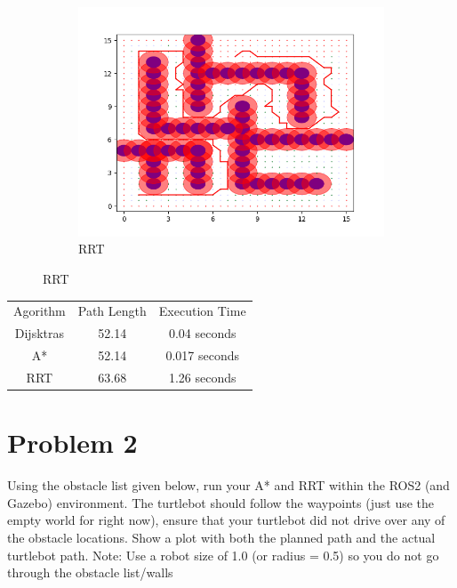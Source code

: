 \documentclass{article}
\begin{document}
\begin{figure}[H]
\begin {subfigure} [b] {0.5\textwidth}
        \includegraphics[width=\textwidth]{question1_rrt_path.png}
        \caption*{RRT}
    \end {subfigure}
\end{figure}

\bigskip
\begin{center}
    \begin{tabular}{ c c c }
        Agorithm & Path Length & Execution Time \\ 
        Dijsktras & 52.14 & 0.04 seconds \\
        A* & 52.14 & 0.017 seconds \\  
        RRT & 63.68 & 1.26 seconds \\

    \end{tabular}
\end{center}

\section*{Problem 2}
Using the obstacle list given below, run your A* and RRT within the ROS2 (and Gazebo)
environment. The turtlebot should follow the waypoints (just use the empty world for right now),
ensure that your turtlebot did not drive over any of the obstacle locations.
Show a plot with both the planned path and the actual turtlebot path.
Note: Use a robot size of 1.0 (or radius = 0.5) so you do not go through the obstacle list/walls
\end{document}
